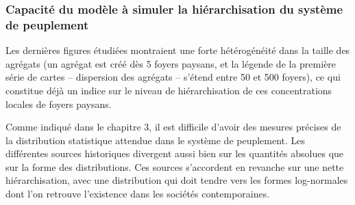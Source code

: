 \subsubsection{Capacité du modèle à simuler la hiérarchisation du système de peuplement}

Les dernières figures étudiées montraient une forte hétérogénéité dans la taille des agrégats (un agrégat est créé dès 5 foyers paysans, et la légende de la première série de cartes -- dispersion des agrégats -- s'étend entre 50 et 500 foyers), ce qui constitue déjà un indice sur le niveau de hiérarchisation de ces concentrations locales de foyers paysans.

Comme indiqué dans le chapitre 3, il est difficile d'avoir des mesures précises de la distribution statistique attendue dans le système de peuplement.
Les différentes sources historiques divergent aussi bien sur les quantités absolues que sur la forme des distributions.
Ces sources s'accordent en revanche sur une nette hiérarchisation, avec une distribution qui doit tendre vers les formes log-normales dont l'on retrouve l'existence dans les sociétés contemporaines.


